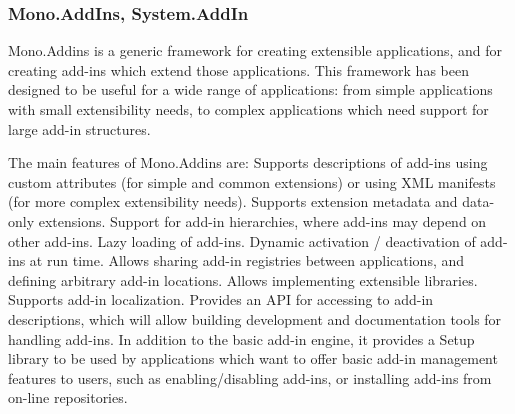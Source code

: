 \subsubsection{Mono.AddIns, System.AddIn}

Mono.Addins is a generic framework for creating extensible applications, and for creating add-ins which extend those applications. This framework has been designed to be useful for a wide range of applications: from simple applications with small extensibility needs, to complex applications which need support for large add-in structures.

The main features of Mono.Addins are:
Supports descriptions of add-ins using custom attributes (for simple and common extensions) or using XML manifests (for more complex extensibility needs).
Supports extension metadata and data-only extensions.
Support for add-in hierarchies, where add-ins may depend on other add-ins.
Lazy loading of add-ins.
Dynamic activation / deactivation of add-ins at run time.
Allows sharing add-in registries between applications, and defining arbitrary add-in locations.
Allows implementing extensible libraries.
Supports add-in localization.
Provides an API for accessing to add-in descriptions, which will allow building development and documentation tools for handling add-ins.
In addition to the basic add-in engine, it provides a Setup library to be used by applications which want to offer basic add-in management features to users, such as enabling/disabling add-ins, or installing add-ins from on-line repositories.
